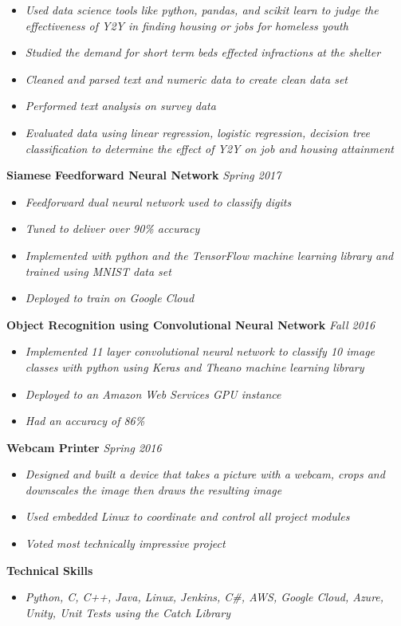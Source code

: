 \documentclass[8pt]{extarticle}
\begin{document}
\begin{itemize}
	\item \textit{Used data science tools like python, pandas, and scikit learn to judge the effectiveness of Y2Y in finding housing or jobs for homeless youth}
	\item \textit{Studied the demand for short term beds effected infractions at the shelter}
	\item \textit{Cleaned and parsed text and numeric data to create clean data set}
	\item \textit{Performed text analysis on survey data}
	\item \textit{Evaluated data using linear regression, logistic regression, decision tree classification to determine the effect of Y2Y on job and housing attainment }
\end{itemize}
\textbf{Siamese Feedforward Neural Network}  \textit{Spring 2017}

\begin{itemize}
\item \textit{Feedforward dual neural network used to classify digits}
\item \textit{Tuned to deliver over 90\% accuracy}
\item \textit{Implemented with python and the TensorFlow machine learning library and trained using MNIST data set}
\item \textit{Deployed to train on Google Cloud}
\end{itemize}
\textbf{Object Recognition using Convolutional Neural Network}  \textit{Fall 2016}

\begin{itemize}
\item \textit{Implemented 11 layer convolutional neural network to classify 10 image classes with python using Keras and Theano machine learning library}
\item \textit{Deployed to an Amazon Web Services GPU instance}
\item \textit{Had an accuracy of 86\%}

\end{itemize}
\textbf{Webcam Printer}  \textit{Spring 2016}

\begin{itemize}
\item \textit{Designed and built a device that takes a picture with a webcam, crops and downscales the image then draws the
resulting image}
\item \textit{Used embedded Linux to coordinate and control all project modules}
\item \textit{Voted most technically impressive project}
\end{itemize}
\begin{changemargin}{-0.8cm}{0.0cm}
\textbf{Technical Skills}
\end{changemargin}
\vspace*{-0.4cm}
\makebox[\linewidth]{\rule{17cm}{0.4pt}}
\begin{itemize}
\item \textit{Python, C, C++, Java, Linux, Jenkins, C\#, AWS, Google Cloud, Azure, Unity, Unit Tests using the Catch Library}


\end{itemize}
\end{document}
